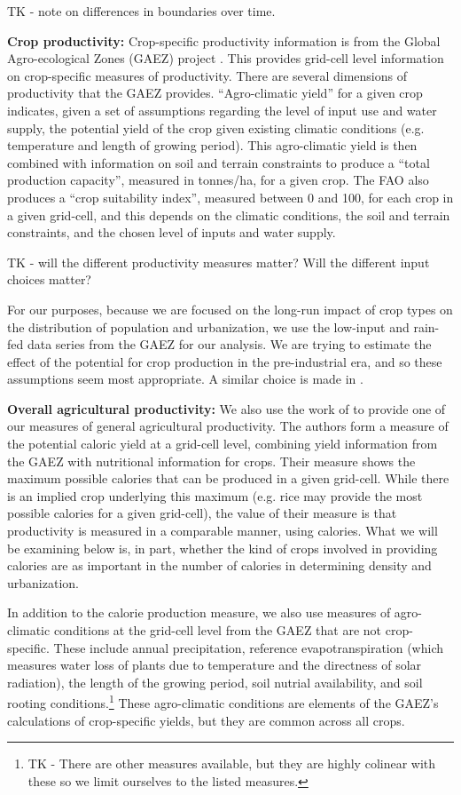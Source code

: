 \documentclass[10pt]{article}
\begin{document}
TK - note on differences in boundaries over time.

\textbf{Crop productivity:} Crop-specific productivity information is from the Global Agro-ecological Zones (GAEZ) project \citep{gaez}. This provides grid-cell level information on crop-specific measures of productivity. There are several dimensions of productivity that the GAEZ provides. ``Agro-climatic yield'' for a given crop indicates, given a set of assumptions regarding the level of input use and water supply, the potential yield of the crop given existing climatic conditions (e.g. temperature and length of growing period). This agro-climatic yield is then combined with information on soil and terrain constraints to produce a ``total production capacity'', measured in tonnes/ha, for a given crop. The FAO also produces a ``crop suitability index'', measured between 0 and 100, for each crop in a given grid-cell, and this depends on the climatic conditions, the soil and terrain constraints, and the chosen level of inputs and water supply.

TK - will the different productivity measures matter? Will the different input choices matter?

For our purposes, because we are focused on the long-run impact of crop types on the distribution of population and urbanization, we use the low-input and rain-fed data series from the GAEZ for our analysis. We are trying to estimate the effect of the potential for crop production in the pre-industrial era, and so these assumptions seem most appropriate. A similar choice is made in \citet{galorozak2016}. 

\textbf{Overall agricultural productivity:} We also use the work of \citet{galorozak2016} to provide one of our measures of general agricultural productivity. The authors form a measure of the potential caloric yield at a grid-cell level, combining yield information from the GAEZ with nutritional information for crops. Their measure shows the maximum possible calories that can be produced in a given grid-cell. While there is an implied crop underlying this maximum (e.g. rice may provide the most possible calories for a given grid-cell), the value of their measure is that productivity is measured in a comparable manner, using calories. What we will be examining below is, in part, whether the kind of crops involved in providing calories are as important in the number of calories in determining density and urbanization.

In addition to the calorie production measure, we also use measures of agro-climatic conditions at the grid-cell level from the GAEZ that are not crop-specific. These include annual precipitation, reference evapotranspiration (which measures water loss of plants due to temperature and the directness of solar radiation), the length of the growing period, soil nutrial availability, and soil rooting conditions.\footnote{TK - There are other measures available, but they are highly colinear with these so we limit ourselves to the listed measures.} These agro-climatic conditions are elements of the GAEZ's calculations of crop-specific yields, but they are common across all crops. 
\end{document}
